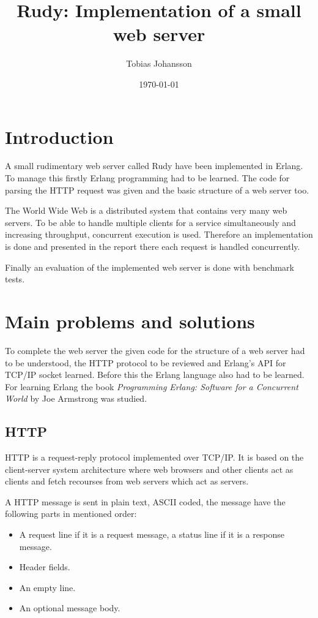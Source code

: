 \documentclass[a4paper, 11pt]{article}
\title{Rudy: Implementation of a small web server}
\author{Tobias Johansson}
\date{\today{}}
\begin{document}
\maketitle

\section{Introduction}
A small rudimentary web server called Rudy have been implemented in Erlang. To manage this firstly Erlang programming had to be learned. The code for parsing the HTTP request was given and the basic structure of a web server too.

The World Wide Web is a distributed system that contains very many web servers. To be able to handle multiple clients for a service simultaneously and increasing throughput, concurrent execution is used. Therefore an implementation is done and presented in the report there each request is handled concurrently.

Finally an evaluation of the implemented web server is done with benchmark tests.

\section{Main problems and solutions}

To complete the web server the given code for the structure of a web server had to be understood, the HTTP protocol to be reviewed and Erlang's API for TCP/IP socket learned. Before this the Erlang language also had to be learned. For learning Erlang the book \textit{Programming Erlang: Software for a Concurrent World} by Joe Armstrong was studied.

\subsection{HTTP}

HTTP is a request-reply protocol implemented over TCP/IP.  It is based on the client-server system architecture where web browsers and other clients act as clients and fetch recourses from web servers which act as servers.

A HTTP message is sent in plain text, ASCII coded, the message have the following parts in mentioned order:

\begin{itemize}

\item A request line if it is a request message, a status line if it is a response message.

\item Header fields.

\item An empty line.

\item An optional message body.

\end{itemize}
\end{document}
